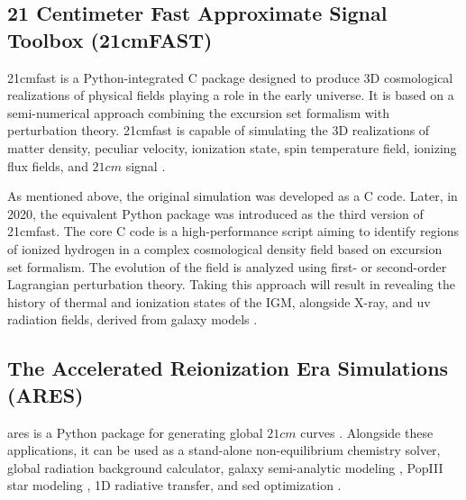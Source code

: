 \documentclass[12pt, TexShade, letterpaper]{report}
\begin{document}
\subsection{21 Centimeter Fast Approximate Signal Toolbox (21cmFAST)}
\gls{21cmfast} is a Python-integrated C package designed to produce 3D cosmological realizations of physical fields playing a role in the early universe. It is based on a semi-numerical approach combining the excursion set formalism with perturbation theory. \gls{21cmfast} is capable of simulating the 3D realizations of matter density, peculiar velocity, ionization state, spin temperature field, ionizing flux fields, and $21cm$ signal \cite{21cmfast_c, 21cmfast_python, 21cmfast_documentation, 21cmfast_github}.\par
As mentioned above, the original simulation was developed as a C code. Later, in 2020, the equivalent Python package was introduced as the third version of \gls{21cmfast}. The core C code is a high-performance script aiming to identify regions of ionized hydrogen in a complex cosmological density field based on excursion set formalism. The evolution of the field is analyzed using first- or second-order Lagrangian perturbation theory. Taking this approach will result in revealing the history of thermal and ionization states of the IGM, alongside X-ray, and \gls{uv} radiation fields, derived from galaxy models \cite{21cmfast_c}. \par

\subsection{The Accelerated Reionization Era Simulations (ARES)}
\gls{ares} is a Python package for generating global $21cm$ curves \cite{ares2014jordan, ares_documentation, ares_github}. Alongside these applications, it can be used as a stand-alone non-equilibrium chemistry solver, global radiation background calculator,  galaxy semi-analytic modeling \cite{jordan_galaxy_1, jordan_galaxy_2, jordan_galaxy_3}, PopIII star modeling \cite{jordan_star}, 1D radiative transfer, and \gls{sed} optimization \cite{jordan_SED}.\par
\end{document}
